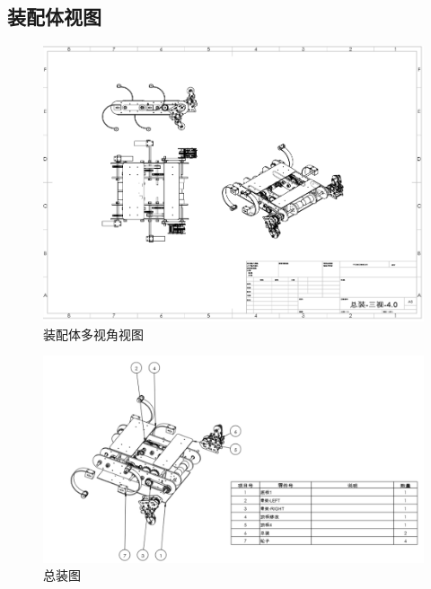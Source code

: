 \documentclass[12pt]{article}
\begin{document}
\begin{CJK}{UTF8}{song}
\subsection{装配体视图}
 \begin{figure}[H]
\centering
\includegraphics[width=.81\textwidth]{chap6//fig1.png}
\caption{装配体多视角视图}
\end{figure}
 \begin{figure}[H]
\centering
\includegraphics[width=.85\textwidth]{chap6//fig2.png}
\caption{总装图}
\end{figure}

\end{CJK}
\end{document}
